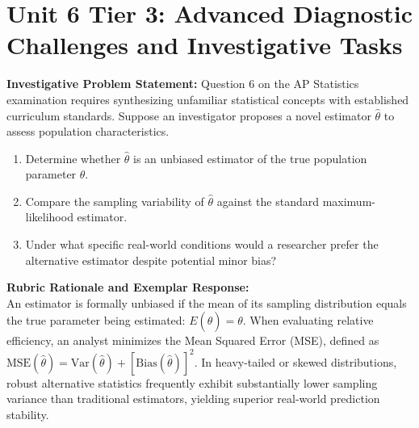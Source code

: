 \section{Unit 6 Tier 3: Advanced Diagnostic Challenges and Investigative Tasks}
\begin{frqrubricbox}
\textbf{Investigative Problem Statement:} Question 6 on the AP Statistics examination requires synthesizing unfamiliar statistical concepts with established curriculum standards. Suppose an investigator proposes a novel estimator $\hat{\theta}$ to assess population characteristics.
\begin{enumerate}[label=(\alph*)]
  \item Determine whether $\hat{\theta}$ is an unbiased estimator of the true population parameter $\theta$.
  \item Compare the sampling variability of $\hat{\theta}$ against the standard maximum-likelihood estimator.
  \item Under what specific real-world conditions would a researcher prefer the alternative estimator despite potential minor bias?
\end{enumerate}
\textbf{Rubric Rationale and Exemplar Response:}\\
An estimator is formally unbiased if the mean of its sampling distribution equals the true parameter being estimated: $E(\hat{\theta}) = \theta$. When evaluating relative efficiency, an analyst minimizes the Mean Squared Error (MSE), defined as $\text{MSE}(\hat{\theta}) = \text{Var}(\hat{\theta}) + [\text{Bias}(\hat{\theta})]^2$. In heavy-tailed or skewed distributions, robust alternative statistics frequently exhibit substantially lower sampling variance than traditional estimators, yielding superior real-world prediction stability.
\end{frqrubricbox}\vspace{6pt}
